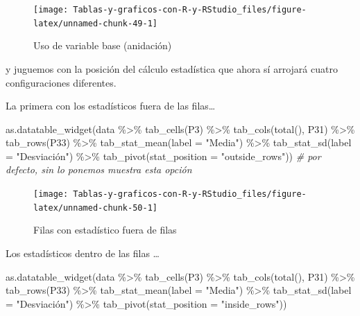 \documentclass[
]{book}
\newenvironment{Shaded}{\begin{snugshade}}{\end{snugshade}}
\newcommand{\AttributeTok}[1]{\textcolor[rgb]{0.77,0.63,0.00}{#1}}
\newcommand{\CommentTok}[1]{\textcolor[rgb]{0.56,0.35,0.01}{\textit{#1}}}
\newcommand{\FunctionTok}[1]{\textcolor[rgb]{0.00,0.00,0.00}{#1}}
\newcommand{\NormalTok}[1]{#1}
\newcommand{\SpecialCharTok}[1]{\textcolor[rgb]{0.00,0.00,0.00}{#1}}
\newcommand{\StringTok}[1]{\textcolor[rgb]{0.31,0.60,0.02}{#1}}
\begin{document}
\begin{figure}[H]

{\centering \texttt{[image: Tablas-y-graficos-con-R-y-RStudio\_files/figure-latex/unnamed-chunk-49-1]} 

}

\caption{Uso de variable base (anidación)}\label{fig:unnamed-chunk-49}
\end{figure}

y juguemos con la posición del cálculo estadística que ahora sí arrojará cuatro configuraciones diferentes.

La primera con los estadísticos fuera de las filas\ldots{}

\begin{Shaded}
\begin{Highlighting}[]
\FunctionTok{as.datatable\_widget}\NormalTok{(data }\SpecialCharTok{\%\textgreater{}\%}
  \FunctionTok{tab\_cells}\NormalTok{(P3) }\SpecialCharTok{\%\textgreater{}\%}
  \FunctionTok{tab\_cols}\NormalTok{(}\FunctionTok{total}\NormalTok{(), P31) }\SpecialCharTok{\%\textgreater{}\%}
  \FunctionTok{tab\_rows}\NormalTok{(P33) }\SpecialCharTok{\%\textgreater{}\%}
  \FunctionTok{tab\_stat\_mean}\NormalTok{(}\AttributeTok{label =} \StringTok{"Media"}\NormalTok{) }\SpecialCharTok{\%\textgreater{}\%}
  \FunctionTok{tab\_stat\_sd}\NormalTok{(}\AttributeTok{label =} \StringTok{"Desviación"}\NormalTok{) }\SpecialCharTok{\%\textgreater{}\%}
  \FunctionTok{tab\_pivot}\NormalTok{(}\AttributeTok{stat\_position =} \StringTok{"outside\_rows"}\NormalTok{))  }\CommentTok{\# por defecto, sin lo ponemos muestra esta opción}
\end{Highlighting}
\end{Shaded}

\begin{figure}[H]

{\centering \texttt{[image: Tablas-y-graficos-con-R-y-RStudio\_files/figure-latex/unnamed-chunk-50-1]} 

}

\caption{Filas con estadístico fuera de filas}\label{fig:unnamed-chunk-50}
\end{figure}

Los estadísticos dentro de las filas \ldots{}

\begin{Shaded}
\begin{Highlighting}[]
\FunctionTok{as.datatable\_widget}\NormalTok{(data }\SpecialCharTok{\%\textgreater{}\%}
  \FunctionTok{tab\_cells}\NormalTok{(P3) }\SpecialCharTok{\%\textgreater{}\%}
  \FunctionTok{tab\_cols}\NormalTok{(}\FunctionTok{total}\NormalTok{(), P31) }\SpecialCharTok{\%\textgreater{}\%}
  \FunctionTok{tab\_rows}\NormalTok{(P33) }\SpecialCharTok{\%\textgreater{}\%}
  \FunctionTok{tab\_stat\_mean}\NormalTok{(}\AttributeTok{label =} \StringTok{"Media"}\NormalTok{) }\SpecialCharTok{\%\textgreater{}\%}
  \FunctionTok{tab\_stat\_sd}\NormalTok{(}\AttributeTok{label =} \StringTok{"Desviación"}\NormalTok{) }\SpecialCharTok{\%\textgreater{}\%}
  \FunctionTok{tab\_pivot}\NormalTok{(}\AttributeTok{stat\_position =} \StringTok{"inside\_rows"}\NormalTok{))}
\end{Highlighting}
\end{Shaded}
\end{document}
